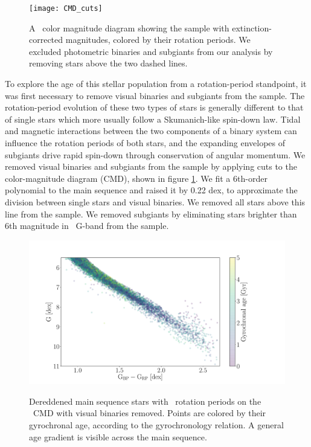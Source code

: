\begin{figure}
  \caption{
A \gaia\ color magnitude diagram showing the \citet{mcquillan2014} sample with
    extinction-corrected magnitudes, colored by their rotation periods.
We excluded photometric binaries and subgiants from our analysis by removing
stars above the two dashed lines.
}
  \centering
    \texttt{[image: CMD\_cuts]}
\label{fig:CMD_cuts}
\end{figure}
To explore the age of this stellar population from a rotation-period
standpoint, it was first necessary to remove visual binaries and subgiants
from the sample.
The rotation-period evolution of these two types of stars is generally
different to that of single stars which more usually follow a Skumanich-like
spin-down law.
Tidal and magnetic interactions between the two components of a binary system
can influence the rotation periods of both stars, and the expanding envelopes
of subgiants drive rapid spin-down through conservation of angular momentum.
We removed visual binaries and subgiants from the sample by applying cuts to
the color-magnitude diagram (CMD), shown in figure \ref{fig:CMD_cuts}.
We fit a 6th-order polynomial to the main sequence and raised it by 0.22 dex,
to approximate the division between single stars and visual binaries.
We removed all stars above this line from the sample.
We removed subgiants by eliminating stars brighter than 6th magnitude in
\gaia\ G-band from the sample.
\begin{figure}
  \caption{
Dereddened main sequence stars with \mct\ rotation periods on the \gaia\ CMD
    with visual binaries removed.  Points are colored by their gyrochronal
    age, according to the
    \citet{angus2019} gyrochronology relation.
    A general age gradient is visible across the main sequence.
}
  \centering
    \includegraphics[width=1\textwidth]{age_gradient}
\label{fig:age_gradient}
\end{figure}

